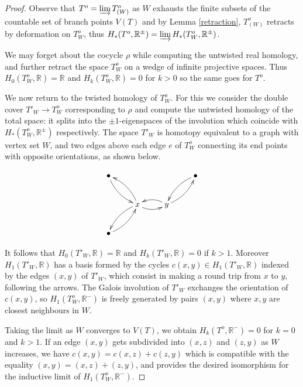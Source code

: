 \documentclass{amsart}
\newcommand{\R}{\mathbb{R}}
\renewcommand{\P}{\mathbb{P}}
\begin{document}
\begin{proof}
Observe that $T^o=\varinjlim T^o_{(W)}$ as $W$ exhausts the finite subsets of the countable set of branch points $V(T)$ and by Lemma \ref{retraction}, $T^o_{(W)}$ retracts by deformation on $T^o_W$, 
thus $H_*(T^o,\R^\pm)=\varinjlim H_*(T^o_W,\R^\pm)$.

We may forget about the cocycle $\rho$ while computing the untwisted real homology, and further retract the space $T^ o_W$ on a wedge of infinite projective spaces. Thus $H_0(T^o_W,\R)=\R$ and $H_k(T^o_W,\R)=0$ for $k>0$ so the same goes for $T^o$. %

We now return to the twisted homology of $T^o_W$. For this we consider the double cover $T'_W\to T^o_W$ corresponding to $\rho$ and compute the untwisted homology of the total space: it splits into the $\pm 1$-eigenspaces of the involution which coincide with $H_*(T^o_W,\R^\pm)$ respectively. 
%
The space $T'_W$ is homotopy equivalent to a graph with vertex set $W$, and two edges above each edge $e$ of $T^o_W$ connecting its end points with opposite orientations, as shown below.

\[\xymatrix{\bullet \ar@/_/[dr]& & &\bullet\ar@/_/[dl] \\
&x\ar@/_/[r]\ar@/_/[dl]\ar@/_/[ul]&y\ar@/_/[l]\ar@/_/[ru]& \\
\bullet\ar@/_/[ur] & & & }\]

It follows that $H_0(T'_W,\R)=\R$ and $H_k(T'_W,\R)=0$ if $k>1$.
Moreover $H_1(T'_W,\R)$ has a basis formed by the cycles $c(x,y)\in H_1(T'_W,\R)$ indexed by the edges $(x,y)$ of $T'_W$, which consist in making a round trip from $x$ to $y$, following the arrows. The Galois involution of $T'_W$ exchanges the orientation of $c(x,y)$, so $H_1(T^o_W,\R^-)$ is freely generated by pairs $(x,y)$ where $x,y$ are closest neighbours in $W$. 

Taking the limit as $W$ converges to $V(T)$, we obtain $H_k(T^o,\R^-)=0$ for $k=0$ and $k>1$. If an edge $(x,y)$ gets subdivided into $(x,z)$ and $(z,y)$ as $W$ increases, we have $c(x,y)=c(x,z)+c(z,y)$ which is compatible with the equality $(x,y)=(x,z)+(z,y)$, and provides the desired isomorphism for the inductive limit of $H_1(T^o_W,\R^-)$.
\end{proof}
\end{document}
